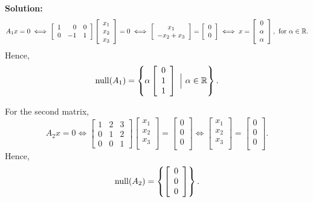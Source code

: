 \textbf{Solution:}
$$A_1x=0 \iff \left[\begin{array}{rrc}  1 & 0 & 0 \\  0 & -1 & 1 \\ \end{array} \right]  \left[\begin{array}{c}  x_1 \\ x_2 \\ x_3\\ \end{array} \right] = 0 \iff \left[\begin{array}{c}  x_1 \\ -x_2 +x_3  \end{array} \right]
 = \left[\begin{array}{c}  0 \\ 0 \end{array} \right] \iff x= \left[\begin{array}{c}  0 \\ \alpha \\ \alpha \end{array} \right], ~\text{for}~ \alpha \in \mathbb R. $$
 Hence, 
$$\mathrm{null}(A_1)=\left\{ \alpha \left[\begin{array}{c}  0 \\ 1 \\ 1 \end{array} \right]~\Big|~ \alpha \in \mathbb R \right\}. $$

For the second matrix, 
 $$A_2 x=0 \iff \left[\begin{array}{ccc}  1 & 2 & 3 \\  0 & 1 & 2 \\ 0 & 0 & 1\end{array} \right]\left[\begin{array}{c}  x_1 \\ x_2 \\ x_3\\ \end{array} \right] = \left[\begin{array}{c}  0\\ 0 \\ 0\\ \end{array} \right] \iff \left[\begin{array}{c}  x_1 \\ x_2 \\ x_3\\ \end{array} \right] = \left[\begin{array}{c}  0\\ 0 \\ 0\\ \end{array} \right]. $$
 Hence, 
$$\mathrm{null}(A_2)=\left\{\left[\begin{array}{c}  0 \\ 0 \\ 0 \end{array} \right] \right\}. $$

